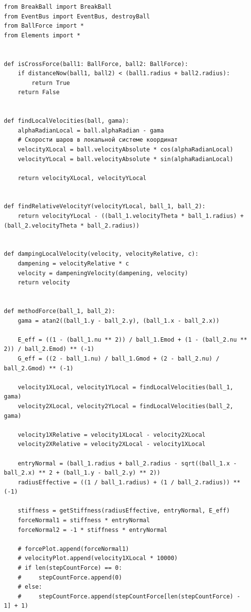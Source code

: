 \documentclass[utf8x, 14pt, oneside, a4paper]{article}
\begin{document}
    \begin{lstlisting}
from BreakBall import BreakBall
from EventBus import EventBus, destroyBall
from BallForce import *
from Elements import *


def isCrossForce(ball1: BallForce, ball2: BallForce):
    if distanceNow(ball1, ball2) < (ball1.radius + ball2.radius):
        return True
    return False


def findLocalVelocities(ball, gama):
    alphaRadianLocal = ball.alphaRadian - gama
    # Скорости шаров в локальной системе координат
    velocityXLocal = ball.velocityAbsolute * cos(alphaRadianLocal)
    velocityYLocal = ball.velocityAbsolute * sin(alphaRadianLocal)

    return velocityXLocal, velocityYLocal


def findRelativeVelocityY(velocityYLocal, ball_1, ball_2):
    return velocityYLocal - ((ball_1.velocityTheta * ball_1.radius) + (ball_2.velocityTheta * ball_2.radius))


def dampingLocalVelocity(velocity, velocityRelative, c):
    dampening = velocityRelative * c
    velocity = dampeningVelocity(dampening, velocity)
    return velocity


def methodForce(ball_1, ball_2):
    gama = atan2((ball_1.y - ball_2.y), (ball_1.x - ball_2.x))

    E_eff = ((1 - (ball_1.nu ** 2)) / ball_1.Emod + (1 - (ball_2.nu ** 2)) / ball_2.Emod) ** (-1)
    G_eff = ((2 - ball_1.nu) / ball_1.Gmod + (2 - ball_2.nu) / ball_2.Gmod) ** (-1)

    velocity1XLocal, velocity1YLocal = findLocalVelocities(ball_1, gama)
    velocity2XLocal, velocity2YLocal = findLocalVelocities(ball_2, gama)

    velocity1XRelative = velocity1XLocal - velocity2XLocal
    velocity2XRelative = velocity2XLocal - velocity1XLocal

    entryNormal = (ball_1.radius + ball_2.radius - sqrt((ball_1.x - ball_2.x) ** 2 + (ball_1.y - ball_2.y) ** 2))
    radiusEffective = ((1 / ball_1.radius) + (1 / ball_2.radius)) ** (-1)

    stiffness = getStiffness(radiusEffective, entryNormal, E_eff)
    forceNormal1 = stiffness * entryNormal
    forceNormal2 = -1 * stiffness * entryNormal

    # forcePlot.append(forceNormal1)
    # velocityPlot.append(velocity1XLocal * 10000)
    # if len(stepCountForce) == 0:
    #     stepCountForce.append(0)
    # else:
    #     stepCountForce.append(stepCountForce[len(stepCountForce) - 1] + 1)


\end{lstlisting}
\end{document}
